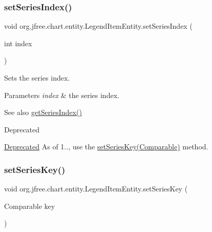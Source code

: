 \subsubsection{\texorpdfstring{set\+Series\+Index()}{setSeriesIndex()}}
{\footnotesize\ttfamily void org.\+jfree.\+chart.\+entity.\+Legend\+Item\+Entity.\+set\+Series\+Index (\begin{DoxyParamCaption}\item[{int}]{index }\end{DoxyParamCaption})}

Sets the series index.


\begin{DoxyParams}{Parameters}
{\em index} & the series index.\\
\hline
\end{DoxyParams}
\begin{DoxySeeAlso}{See also}
\mbox{\hyperlink{classorg_1_1jfree_1_1chart_1_1entity_1_1_legend_item_entity_ab37af6a271e6d5d48afd0ff80a5a440d}{get\+Series\+Index()}}
\end{DoxySeeAlso}
\begin{DoxyRefDesc}{Deprecated}
\item[\mbox{\hyperlink{deprecated__deprecated000049}{Deprecated}}]As of 1.., use the \mbox{\hyperlink{classorg_1_1jfree_1_1chart_1_1entity_1_1_legend_item_entity_aad5679e1643d398bfd7f0eaed1a5d521}{set\+Series\+Key(\+Comparable)}} method. \end{DoxyRefDesc}
\mbox{\label{classorg_1_1jfree_1_1chart_1_1entity_1_1_legend_item_entity_aad5679e1643d398bfd7f0eaed1a5d521}} 
\subsubsection{\texorpdfstring{set\+Series\+Key()}{setSeriesKey()}}
{\footnotesize\ttfamily void org.\+jfree.\+chart.\+entity.\+Legend\+Item\+Entity.\+set\+Series\+Key (\begin{DoxyParamCaption}\item[{Comparable}]{key }\end{DoxyParamCaption})}

